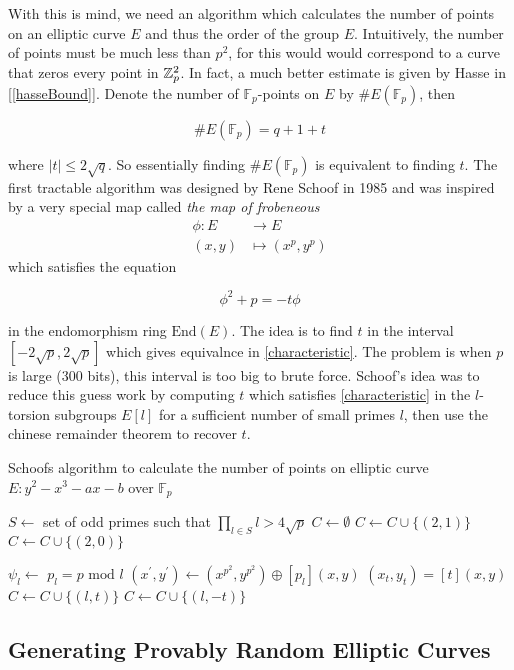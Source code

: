 With this is mind, we need an algorithm which calculates the number of points on an elliptic curve $E$ and thus the order of the group $E$. Intuitively, the number of points must be much less than $p^2$, for this would would correspond to a curve that zeros every point in $\mathbb{Z}_p^2$. In fact, a much better estimate is given by Hasse in [\ref{hasseBound}]. Denote the number of $\mathbb{F}_p$-points on $E$ by $\# E(\mathbb{F}_p)$, then  

\begin{equation}
	\# E(\mathbb{F}_p) = q + 1 + t
\end{equation}

where $|t| \leq 2  \sqrt{q}$. So essentially finding $\# E(\mathbb{F}_p)$ is equivalent to finding $t$. The first tractable algorithm was designed by Rene Schoof in 1985 and was inspired by a very special map called \textit{the map of frobeneous}
\begin{align*}
	\phi : E &\rightarrow E \\
	(x,y) &\mapsto (x^p,y^p)
\end{align*}
which satisfies the equation 

\begin{equation} 
	\phi^2 + p = - t \phi \label{characteristic}
\end{equation} 

 in the endomorphism ring $\text{End}(E)$. The idea is to find $t$ in the interval $[-2 \sqrt{p},2 \sqrt{p}]$ which gives equivalnce in \eqref{characteristic}. The problem is when $p$ is large ($300$ bits), this interval is too big to brute force. Schoof's idea was to reduce this guess work by computing $t$ which satisfies \eqref{characteristic} in the $l$-torsion subgroups $E[l]$ for a sufficient number of small primes $l$, then use the chinese remainder theorem to recover $t$. 


\begin{algorithm}
	\caption{Schoofs algorithm to calculate the number of points on elliptic curve $E : y^2 - x^3 - ax - b$ over $\mathbb{F}_p$}
	\begin{algorithmic}[1]
			\State $S \leftarrow $ set of odd primes such that $\prod_{l \in S}l > 4\sqrt{p}$  
			\State $C \leftarrow \emptyset $
				\State $C \leftarrow C \cup \lbrace (2,1) \rbrace $
			\Else 
				\State $C \leftarrow C \cup \lbrace (2,0) \rbrace $
			\EndIf

				\State $\psi_l \leftarrow $  
				\State $p_l = p \text{ mod } l$
				\State $(x^\prime,y^\prime) \leftarrow (x^{p^2},y^{p^2}) \oplus [p_l](x,y) $ 
					\State $(x_{t},y_{t}) = [t](x,y)$
							\State $C \leftarrow C \cup \lbrace (l,t) \rbrace $
						\Else
							\State $C \leftarrow C \cup \lbrace (l,-t) \rbrace $
						\EndIf
					\EndIf
				\EndFor 
			\EndFor 
	  	\EndFunction
	\end{algorithmic} 
\end{algorithm} 





\subsection{Generating Provably Random Elliptic Curves}
